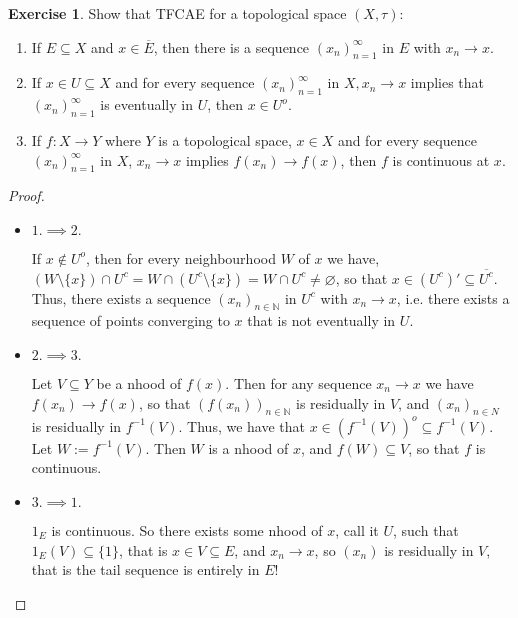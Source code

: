 \documentclass[12pt]{extarticle}
\newcommand{\set}[1]{\{#1\}}
\newcommand{\N}{\mathbb{N}}
\newcommand{\<}{\langle}
\renewcommand{\>}{\rangle}
\renewcommand{\emptyset}{\varnothing}
\theoremstyle{definition}
\newtheorem{exercise}{Exercise}
\begin{document}
\begin{exercise}
  Show that TFCAE for a topological space $(X, \tau)$:
  \begin{enumerate}
  \item
    If $E \subseteq X$ and $x \in \overline{E}$, then there is a sequence $(x_n)_{n=1}^{\infty}$ in $E$ with $x_n \to x$.
  \item
    If $x \in U \subseteq X$ and for every sequence $(x_n)_{n=1}^{\infty}$ in $X, x_n \to x$ implies that $(x_n)_{n=1}^{\infty}$ is eventually in $U$, then $x \in U^o$.
  \item
    If $f:X \to Y$ where $Y$ is a topological space, $x \in X$ and for every sequence $(x_n)_{n=1}^{\infty}$ in $X$, $x_n \to x$ implies $f(x_n) \to f(x)$,
    then $f$ is continuous at $x$. 
  \end{enumerate}
\end{exercise}

\begin{proof}
  \begin{itemize}
  \item
    $1. \implies 2.$
    
    If $x \not \in U^o$, then for every neighbourhood $W$ of $x$ we have, $(W \setminus \set{x}) \cap U^c = W\cap (U^c \setminus \set{x}) = W \cap U^c \neq \emptyset$,
    so that $x \in (U^c)' \subseteq \overline{U^c}$. Thus, there exists a sequence $(x_n)_{n \in \N}$ in $U^c$ with $x_n \to x$, i.e. there exists a sequence of points converging to $x$ that is not eventually in $U$. 
  \item
    $2. \implies 3.$
    
    Let $V \subseteq Y$ be a nhood of $f(x)$. Then for any sequence $x_n \to x$ we have $f(x_n) \to f(x)$, so that $(f(x_n))_{n \in \N}$ is residually in $V$,
    and $(x_n)_{n \in N}$ is residually in $f^{-1}(V)$. Thus, we have that $x \in (f^{-1}(V))^o \subseteq f^{-1}(V)$. Let $W:=f^{-1}(V)$. Then $W$ is a nhood of $x$,
    and $f(W) \subseteq V$, so that $f$ is continuous. 
  \item
    $3. \implies 1.$

    $1_E$ is continuous. So there exists some nhood of $x$, call it $U$, such that $1_E(V) \subseteq \set{1}$, that is $x \in V \subseteq E$, and $x_n \to x$, so $(x_n)$ is residually in $V$, that is the tail sequence is entirely in $E$!
  \end{itemize}
\end{proof}
\end{document}
